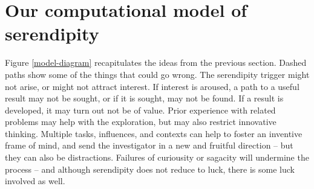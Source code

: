 \section{Our computational model of serendipity} \label{sec:our-model}

Figure \ref{model-diagram} recapitulates the ideas from the previous
section.  Dashed paths show some of the things that could go wrong.
The serendipity trigger might not arise, or might not attract
interest.  If interest is aroused, a path to a useful result may not
be sought, or if it is sought, may not be found.  If a result is
developed, it may turn out not be of value.  Prior experience with
related problems may help with the exploration, but may also restrict
innovative thinking.  Multiple tasks, influences, and contexts can help to foster
an inventive frame of mind, and send the investigator in a
new and fruitful direction -- but they can also be distractions.
Failures of curiousity or sagacity will undermine the process -- and
although serendipity does not reduce to luck, there is some luck
involved as well.

